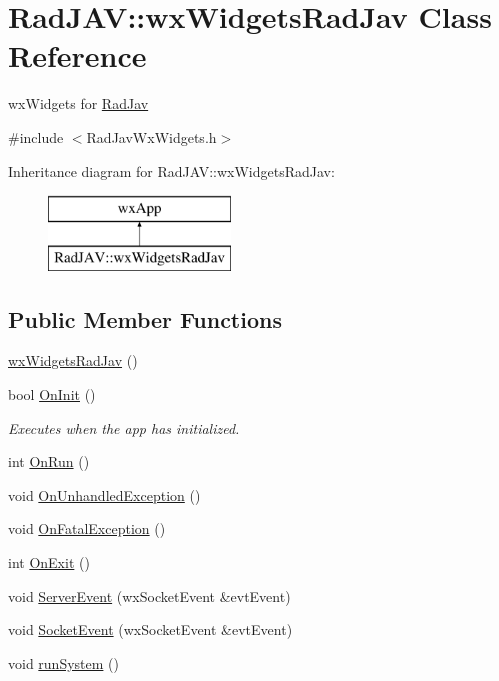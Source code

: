 \hypertarget{class_rad_j_a_v_1_1wx_widgets_rad_jav}{}\section{Rad\+J\+AV\+:\+:wx\+Widgets\+Rad\+Jav Class Reference}
\label{class_rad_j_a_v_1_1wx_widgets_rad_jav}


wx\+Widgets for \mbox{\hyperlink{class_rad_j_a_v_1_1_rad_jav}{Rad\+Jav}}  




{\ttfamily \#include $<$Rad\+Jav\+Wx\+Widgets.\+h$>$}

Inheritance diagram for Rad\+J\+AV\+:\+:wx\+Widgets\+Rad\+Jav\+:\begin{figure}[H]
\begin{center}
\leavevmode
\includegraphics[height=2.000000cm]{class_rad_j_a_v_1_1wx_widgets_rad_jav}
\end{center}
\end{figure}
\subsection*{Public Member Functions}
\begin{DoxyCompactItemize}
\item 
\mbox{\hyperlink{class_rad_j_a_v_1_1wx_widgets_rad_jav_a81ff56b4ae9e9d4c50155151eadc35b7}{wx\+Widgets\+Rad\+Jav}} ()
\item 
bool \mbox{\hyperlink{class_rad_j_a_v_1_1wx_widgets_rad_jav_a9e8269312d40feafc94718a0b2912de8}{On\+Init}} ()
\begin{DoxyCompactList}\small\item\em Executes when the app has initialized. \end{DoxyCompactList}\item 
int \mbox{\hyperlink{class_rad_j_a_v_1_1wx_widgets_rad_jav_a37c46a1705f10f3bd0a79fa148361400}{On\+Run}} ()
\item 
void \mbox{\hyperlink{class_rad_j_a_v_1_1wx_widgets_rad_jav_a8fc014edbdcd68cc1ad849fe148f9871}{On\+Unhandled\+Exception}} ()
\item 
void \mbox{\hyperlink{class_rad_j_a_v_1_1wx_widgets_rad_jav_ad73346ef2ddf9aa8855bf07c349519cb}{On\+Fatal\+Exception}} ()
\item 
int \mbox{\hyperlink{class_rad_j_a_v_1_1wx_widgets_rad_jav_add7d79813e2e017382a8a9da399e91ce}{On\+Exit}} ()
\item 
void \mbox{\hyperlink{class_rad_j_a_v_1_1wx_widgets_rad_jav_ad96e50771b485673fbefaf9bb102441d}{Server\+Event}} (wx\+Socket\+Event \&evt\+Event)
\item 
void \mbox{\hyperlink{class_rad_j_a_v_1_1wx_widgets_rad_jav_a2bf79b1939cb6f8239e6a5144701fa6d}{Socket\+Event}} (wx\+Socket\+Event \&evt\+Event)
\item 
void \mbox{\hyperlink{class_rad_j_a_v_1_1wx_widgets_rad_jav_aefe213408c6f7fb404d5a8a270e9b7d7}{run\+System}} ()
\end{DoxyCompactItemize}
